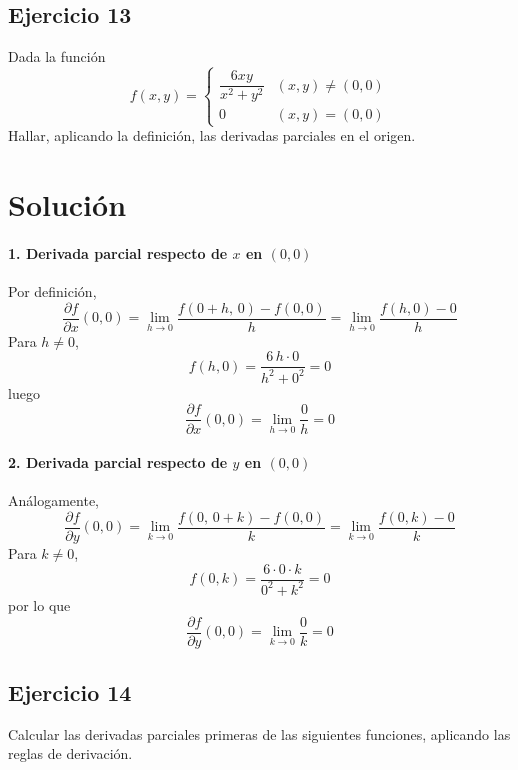 \documentclass{article}
\begin{document}
\newpage

\subsection{Ejercicio 13}
Dada la función
\[
f(x,y) =
\begin{cases}
\dfrac{6xy}{x^2 + y^2} & (x,y)\neq (0,0)\\[6pt]
0 & (x,y)=(0,0)
\end{cases}
\]
Hallar, aplicando la definición, las derivadas parciales en el origen.

\newpage
\section*{Solución}

\paragraph{1. Derivada parcial respecto de \(x\) en \((0,0)\)}
Por definición,
\[
\frac{\partial f}{\partial x}(0,0)
= \lim_{h\to0}\frac{f(0+h,\,0)-f(0,0)}{h}
= \lim_{h\to0}\frac{f(h,0)-0}{h}
\]
Para \(h\neq0\),
\[
f(h,0)
=\frac{6\,h\cdot0}{h^2+0^2}=0
\]
luego
{\color{teal}
\[
\frac{\partial f}{\partial x}(0,0)
= \lim_{h\to0}\frac{0}{h}
=0
\]
} %

\paragraph{2. Derivada parcial respecto de \(y\) en \((0,0)\)}
Análogamente,
\[
\frac{\partial f}{\partial y}(0,0)
= \lim_{k\to0}\frac{f(0,\,0+k)-f(0,0)}{k}
= \lim_{k\to0}\frac{f(0,k)-0}{k}
\]
Para \(k\neq0\),
\[
f(0,k)
=\frac{6\cdot0\cdot k}{0^2+k^2}=0
\]
por lo que
{\color{teal}
\[
\frac{\partial f}{\partial y}(0,0)
= \lim_{k\to0}\frac{0}{k}
=0
\]
} %


\newpage

\subsection{Ejercicio 14}

Calcular las derivadas parciales primeras de las siguientes funciones, aplicando las reglas de derivación.
\end{document}
